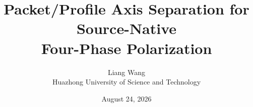 \documentclass[11pt,a4paper]{article}
\title{Packet/Profile Axis Separation for Source-Native\\Four-Phase Polarization}
\author{Liang Wang\\Huazhong University of Science and Technology}
\date{August 24, 2026}
\theoremstyle{remark}
\begin{document}
\maketitle

\begin{abstract}

\end{abstract}










\end{document}

